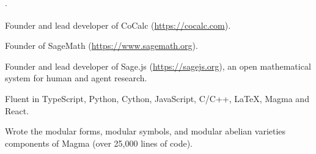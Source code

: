 \documentclass[10pt]{article}
\newenvironment{bulletlist}
   {
      \begin{list}
         {$\cdot$}
         {
            \setlength{\itemsep}{.5ex}
            \setlength{\parsep}{0ex}
            \setlength{\leftmargin}{2.2em}
            \setlength{\parskip}{0ex}
            \setlength{\topsep}{0ex}
         }
   }
   {
      \end{list}
   }
\newcommand{\marginlabel}[1]{
\begin{minipage}[b]{0.8\labelwidth}{\large \textsf{\textbf{#1}}}\end{minipage}}
\newcommand{\entrylabel}[1]{\mbox{\marginlabel{#1}}\hfill}
\newcommand{\MainListlabel}[1]
   {
      \parbox[t]{\labelwidth}{\hspace{.8em}\marginlabel{#1}}
   }
\newenvironment{MainList}[1]
   {
      \renewcommand{\entrylabel}{\MainListlabel}
      \begin{list}{}
      {
         \renewcommand{\makelabel}{\entrylabel}
         \setlength   {\itemindent}{-.65em}
         \setlength   {\labelwidth}{#1}
         \setlength   {\leftmargin}{\labelwidth}
         \setlength   {\itemsep}{3ex}
      }
   }
   {
      \end{list}
   }
\begin{document}
\begin{MainList}{88pt}
\item [Computation]
\begin{bulletlist}
\item Founder and lead developer of CoCalc
(\url{https://cocalc.com}).
\item Founder of SageMath (\url{https://www.sagemath.org}).
\item Founder and lead developer of Sage.js (\url{https://sagejs.org}),
an open mathematical system for human and agent research.
\item Fluent in TypeScript, Python, Cython, JavaScript, C/C++, LaTeX, Magma and React.
\item Wrote the modular forms, modular symbols, and modular abelian
  varieties components of Magma (over 25,000 lines of code).
\end{bulletlist}

\item [Selected Teaching]




\end{MainList}
\end{document}
